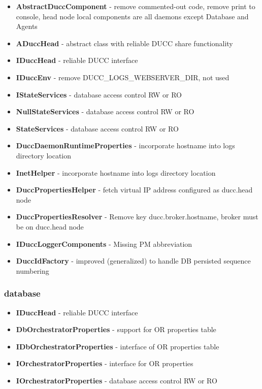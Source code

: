 \documentclass[letterpaper]{article}
\begin{document}
{\renewcommand\labelitemi{}
\begin{itemize}
  \item \textbf{AbstractDuccComponent} - remove commented-out code, remove print to console, head node local components are all daemons except Database and Agents
  \item \textbf{ADuccHead} - abstract class with reliable DUCC share functionality
  \item \textbf{IDuccHead} - reliable DUCC interface
  \item \textbf{IDuccEnv} - remove DUCC\_LOGS\_WEBSERVER\_DIR, not used
  \item \textbf{IStateServices} - database access control RW or RO
  \item \textbf{NullStateServices} - database access control RW or RO
  \item \textbf{StateServices} - database access control RW or RO
  \item \textbf{DuccDaemonRuntimeProperties} - incorporate hostname into logs directory location
  \item \textbf{InetHelper} - incorporate hostname into logs directory location
  \item \textbf{DuccPropertiesHelper} - fetch virtual IP address configured as ducc.head node
  \item \textbf{DuccPropertiesResolver} - Remove key ducc.broker.hostname, broker must be on ducc.head node
  \item \textbf{IDuccLoggerComponents} - Missing PM abbreviation
  \item \textbf{DuccIdFactory} - improved (generalized) to handle DB persisted sequence numbering
\end{itemize}
}

\subsubsection{database}

{\renewcommand\labelitemi{}
\begin{itemize}
  \item \textbf{IDuccHead} - reliable DUCC interface
  \item \textbf{DbOrchestratorProperties} - support for OR properties table
  \item \textbf{IDbOrchestratorProperties} - interface of OR properties table
  \item \textbf{IOrchestratorProperties} - interface for OR properties
  \item \textbf{IOrchestratorProperties} - database access control RW or RO
\end{itemize}
}
\end{document}
